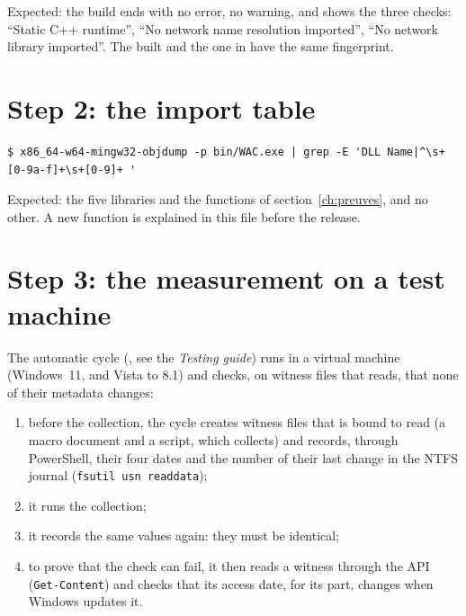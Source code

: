 \documentclass[11pt,a4paper,oneside]{report}
\begin{document}
Expected: the build ends with no error, no warning, and shows the three
checks: ``Static C++ runtime'', ``No network name resolution imported'', ``No
network library imported''. The  built and the one in
 have the same fingerprint.

\section{Step 2: the import table}

\begin{lstlisting}
$ x86_64-w64-mingw32-objdump -p bin/WAC.exe | grep -E 'DLL Name|^\s+[0-9a-f]+\s+[0-9]+ '
\end{lstlisting}

Expected: the five libraries and the functions of
section~\ref{ch:preuves}, and no other. A new function is explained in this
file before the release.

\section{Step 3: the measurement on a test machine}

The automatic cycle (, see the \emph{Testing
guide}) runs \wac{} in a virtual machine (Windows~11, and Vista to 8.1) and checks, on witness
files that \wac{} reads, that none of their metadata changes:

\begin{enumerate}
  \item before the collection, the cycle creates witness files that \wac{} is
        bound to read (a macro document and a script, which 
        collects) and records, through PowerShell, their four dates and the
        number of their last change in the NTFS journal
        (\texttt{fsutil usn readdata});
  \item it runs the collection;
  \item it records the same values again: they must be identical;
  \item to prove that the check can fail, it then reads a witness through the
        API (\texttt{Get-Content}) and checks that its access date, for its
        part, changes when Windows updates it.
\end{enumerate}
\end{document}
